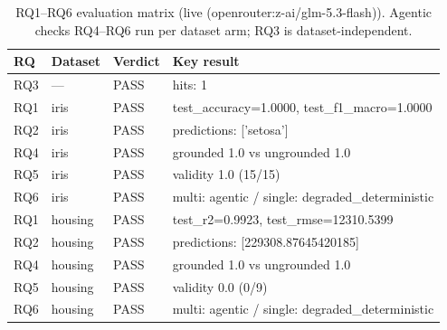 \begin{table}[H]
\centering\small
\caption{RQ1--RQ6 evaluation matrix (live (openrouter:z-ai/glm-5.3-flash)). Agentic checks RQ4--RQ6 run per dataset arm; RQ3 is dataset-independent.}
\label{tab:rq-matrix-live-openrouter-glm-matrix-20260903}
\begin{tabular}{llll}
\toprule
RQ & Dataset & Verdict & Key result \\
\midrule
RQ3 & — & PASS & hits: 1 \\
RQ1 & iris & PASS & test\_accuracy=1.0000, test\_f1\_macro=1.0000 \\
RQ2 & iris & PASS & predictions: ['setosa'] \\
RQ4 & iris & PASS & grounded 1.0 vs ungrounded 1.0 \\
RQ5 & iris & PASS & validity 1.0 (15/15) \\
RQ6 & iris & PASS & multi: agentic / single: degraded\_deterministic \\
RQ1 & housing & PASS & test\_r2=0.9923, test\_rmse=12310.5399 \\
RQ2 & housing & PASS & predictions: [229308.87645420185] \\
RQ4 & housing & PASS & grounded 1.0 vs ungrounded 1.0 \\
RQ5 & housing & PASS & validity 0.0 (0/9) \\
RQ6 & housing & PASS & multi: agentic / single: degraded\_deterministic \\
\bottomrule
\end{tabular}
\end{table}
